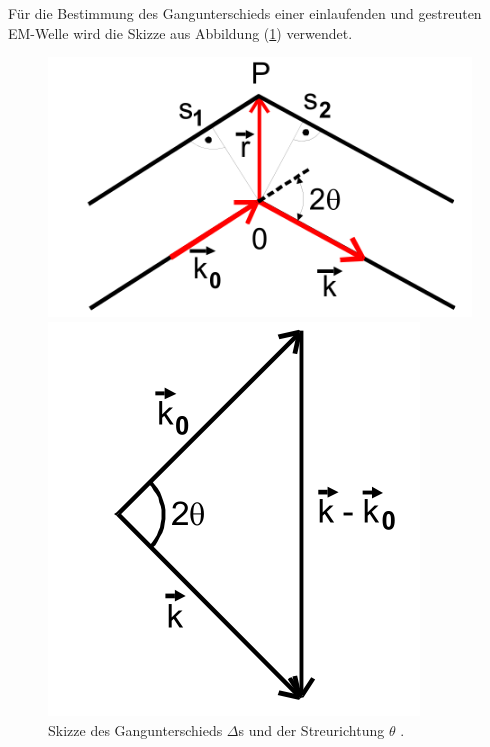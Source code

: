 Für die Bestimmung des Gangunterschieds einer einlaufenden und gestreuten EM-Welle wird die Skizze aus Abbildung (\ref{fig:streuung}) verwendet.
\begin{figure}[h]
	\begin{minipage}[t]{0.45\textwidth}
		\includegraphics[width = \textwidth]{Abbildungen/streuung}
	\end{minipage}
	\begin{minipage}[t]{0.45\textwidth}
		\includegraphics[width = \textwidth]{Abbildungen/streuwinkel}	
	\end{minipage}
	\caption{ Skizze des Gangunterschieds $\Delta$s und der Streurichtung $\theta$ \cite{Anleitung}. }
	\label{fig:streuung}
\end{figure}
